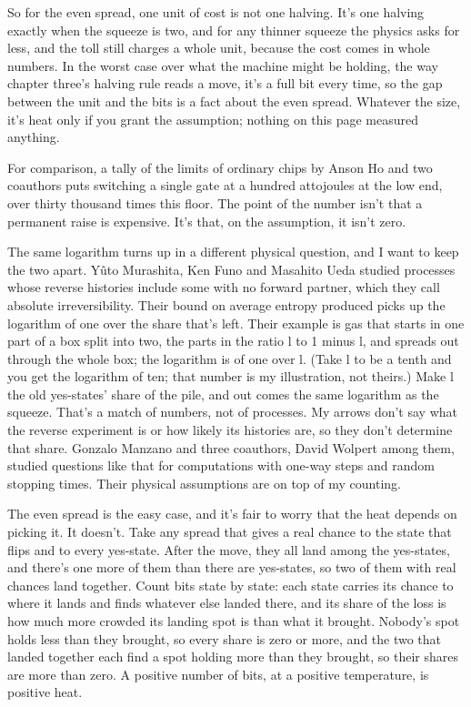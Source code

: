 \documentclass[11pt,twoside]{article}
\theoremstyle{thielethm}
\theoremstyle{thieledef}
\theoremstyle{thieledef}
\theoremstyle{thieledef}
\theoremstyle{thielethm}
\theoremstyle{thieleobs}
\theoremstyle{thielethm}
\begin{document}
So for the even spread, one unit of cost is not one halving. It's one halving exactly when the squeeze is two, and for any thinner squeeze the physics asks for less, and the toll still charges a whole unit, because the cost comes in whole numbers. In the worst case over what the machine might be holding, the way chapter three's halving rule reads a move, it's a full bit every time, so the gap between the unit and the bits is a fact about the even spread. Whatever the size, it's heat only if you grant the assumption; nothing on this page measured anything.

For comparison, a tally of the limits of ordinary chips by Anson Ho and two coauthors puts switching a single gate at a hundred attojoules at the low end, over thirty thousand times this floor. The point of the number isn't that a permanent raise is expensive. It's that, on the assumption, it isn't zero.

The same logarithm turns up in a different physical question, and I want to keep the two apart. Yûto Murashita, Ken Funo and Masahito Ueda studied processes whose reverse histories include some with no forward partner, which they call absolute irreversibility. Their bound on average entropy produced picks up the logarithm of one over the share that's left. Their example is gas that starts in one part of a box split into two, the parts in the ratio l to 1 minus l, and spreads out through the whole box; the logarithm is of one over l. (Take l to be a tenth and you get the logarithm of ten; that number is my illustration, not theirs.) Make l the old yes-states' share of the pile, and out comes the same logarithm as the squeeze. That's a match of numbers, not of processes. My arrows don't say what the reverse experiment is or how likely its histories are, so they don't determine that share. Gonzalo Manzano and three coauthors, David Wolpert among them, studied questions like that for computations with one-way steps and random stopping times. Their physical assumptions are on top of my counting.

The even spread is the easy case, and it's fair to worry that the heat depends on picking it. It doesn't. Take any spread that gives a real chance to the state that flips and to every yes-state. After the move, they all land among the yes-states, and there's one more of them than there are yes-states, so two of them with real chances land together. Count bits state by state: each state carries its chance to where it lands and finds whatever else landed there, and its share of the loss is how much more crowded its landing spot is than what it brought. Nobody's spot holds less than they brought, so every share is zero or more, and the two that landed together each find a spot holding more than they brought, so their shares are more than zero. A positive number of bits, at a positive temperature, is positive heat.
\end{document}
